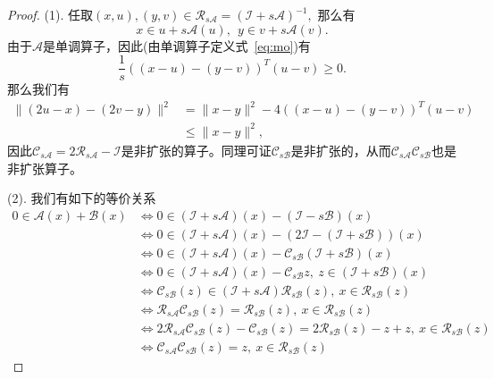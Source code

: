 \begin{proof}
(1). 任取$(x, u), (y, v) \in \mathcal{R}_{s\mathcal{A}} = (\mathcal{I} + s \mathcal{A})^{-1},$ 那么有
\begin{equation*}
x \in u + s\mathcal{A}(u), ~~ y \in v + s\mathcal{A}(v).
\end{equation*}
由于$\mathcal{A}$是单调算子，因此(由单调算子定义式~\eqref{eq:mo})有
\begin{equation*}
\frac{1}{s}((x - u) - (y - v))^T (u - v) \geqslant 0.
\end{equation*}
那么我们有
\begin{align*}
\lVert (2u - x) - (2v - y) \rVert^2 & = \lVert x - y \rVert^2 - 4 ((x - u) - (y - v))^T (u - v) \\
& \leqslant \lVert x - y \rVert^2,
\end{align*}
因此$\mathcal{C}_{s\mathcal{A}} = 2 \mathcal{R}_{s\mathcal{A}} - \mathcal{I}$是非扩张的算子。同理可证$\mathcal{C}_{s\mathcal{B}}$是非扩张的，从而$\mathcal{C}_{s\mathcal{A}} \mathcal{C}_{s\mathcal{B}}$也是非扩张算子。

(2). 我们有如下的等价关系
\begin{align*}
0 \in \mathcal{A}(x) + \mathcal{B}(x) & \Longleftrightarrow 0 \in (\mathcal{I} + s\mathcal{A})(x) - (\mathcal{I} - s\mathcal{B})(x) \\
& \Longleftrightarrow 0 \in (\mathcal{I} + s\mathcal{A})(x) - (2\mathcal{I} - (\mathcal{I} + s\mathcal{B}))(x) \\
& \Longleftrightarrow 0 \in (\mathcal{I} + s\mathcal{A})(x) - \mathcal{C}_{s\mathcal{B}} (\mathcal{I} + s\mathcal{B})(x) \\
& \Longleftrightarrow 0 \in (\mathcal{I} + s\mathcal{A})(x) - \mathcal{C}_{s\mathcal{B}} z, ~ z \in (\mathcal{I} + s\mathcal{B}) (x) \\
& \Longleftrightarrow \mathcal{C}_{s\mathcal{B}} (z) \in (\mathcal{I} + s\mathcal{A}) \mathcal{R}_{s\mathcal{B}} (z) , ~ x \in \mathcal{R}_{s\mathcal{B}} (z) \\
& \Longleftrightarrow \mathcal{R}_{s\mathcal{A}} \mathcal{C}_{s\mathcal{B}} (z) = \mathcal{R}_{s\mathcal{B}} (z), ~ x \in \mathcal{R}_{s\mathcal{B}} (z) \\
& \Longleftrightarrow 2\mathcal{R}_{s\mathcal{A}} \mathcal{C}_{s\mathcal{B}} (z) - \mathcal{C}_{s\mathcal{B}} (z) = 2 \mathcal{R}_{s\mathcal{B}} (z) - z + z, ~ x \in \mathcal{R}_{s\mathcal{B}} (z) \\
& \Longleftrightarrow \mathcal{C}_{s\mathcal{A}} \mathcal{C}_{s\mathcal{B}} (z) = z, ~ x \in \mathcal{R}_{s\mathcal{B}} (z)
\end{align*}
\end{proof}

